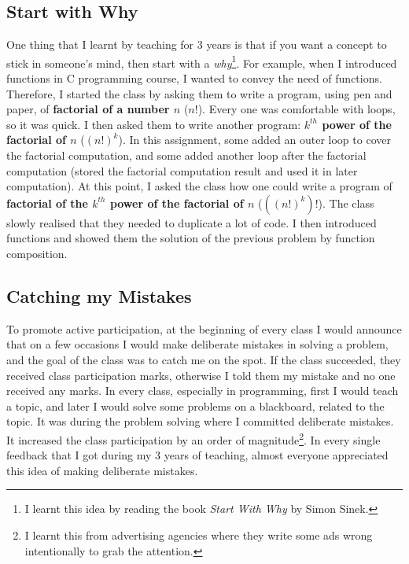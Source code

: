 \documentclass[a4paper]{article}
\begin{document}
\subsection{Start with Why}
One thing that I learnt by teaching for 3 years is that if you want a concept 
to stick in someone's mind, then start with a \textit{why}\footnote{I learnt this idea by reading the book 
\textit{Start With Why} by Simon Sinek.}. For example, when I introduced functions 
in C programming course, I wanted to convey the need of functions. Therefore, I started the class by 
asking them to write a program, using pen and paper, of \textbf{factorial of a number $n$} ($n!$). 
Every one was comfortable with loops, so it was quick. I then asked them to write 
another program: \textbf{$k^{th}$ power of the factorial of $n$} ($(n!)^k$). 
In this assignment, some added an outer loop to cover the factorial computation, 
and some added another loop after the factorial computation (stored the factorial 
computation result and used it in later computation). 
At this point, I asked the class 
how one could write a program of \textbf{factorial of 
the $k^{th}$ power of the factorial of $n$} ($((n!)^k)!$). The class slowly realised 
that they needed to duplicate a lot of code. I then introduced functions 
and showed them the solution of the previous problem by function composition.


\subsection{Catching my Mistakes}
To promote active participation, at the beginning of every class I would announce that 
on a few occasions I would make deliberate mistakes in solving a problem, and the
goal of the class was to catch me on the spot.
If the class succeeded, they received  
class participation marks, otherwise I told them my 
mistake and no one received any marks.
In every class, especially in programming, 
first I would teach a topic, and later I would solve some problems on 
a blackboard, related to the topic. 
It was during the problem solving where I committed deliberate mistakes.
It increased the class participation by an order of 
magnitude\footnote{I learnt this 
from advertising agencies where they write some ads wrong 
intentionally to grab the attention.}. In every single 
feedback that I got during my 3 years of teaching, 
almost everyone appreciated this idea of making deliberate mistakes. 
\end{document}
